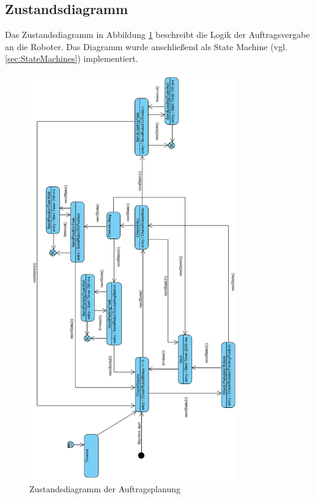 \subsection{Zustandsdiagramm}

Das Zustandsdiagramm in Abbildung \ref{fig:Auftragsplanung} beschreibt die Logik der Auftragsvergabe an die Roboter. Das Diagramm wurde anschließend als State Machine (vgl. \ref{sec:StateMachines}) implementiert. 

\begin{figure}[htb]
    \centering
    \includegraphics[width=0.8\textwidth]{Abbildungen/Auftragsplanung_rotated.PNG}
    \caption{Zustandsdiagramm der Auftragsplanung}		
    \label{fig:Auftragsplanung}
\end{figure}

